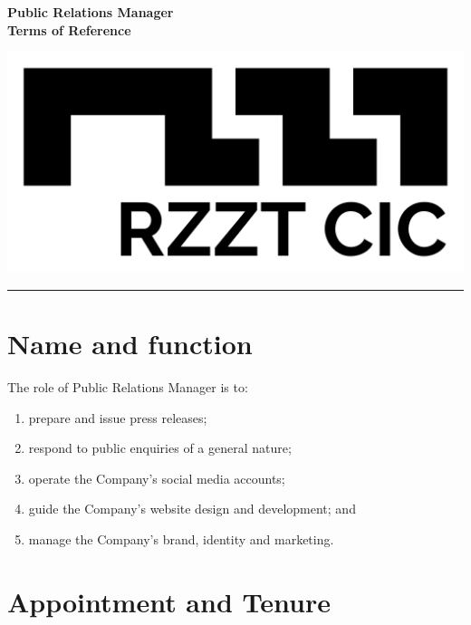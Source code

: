 \documentclass[a4paper,10pt]{article}
\renewcommand{\labelenumi}{(\arabic{enumi})}
\begin{document}
\thispagestyle{firstpage}

\begin{minipage}[b]{0.75\textwidth}
  \raggedright
  \LARGE{\textbf{Public Relations Manager\\Terms of Reference}}
  \vspace{0.2em}
\end{minipage}
%
\begin{minipage}[b]{0.25\textwidth}
  \raggedleft
  \includegraphics[width=1\textwidth]{logo-black.jpg}
\end{minipage}

\hrule

\vspace{2em}

\section{Name and function}

The role of Public Relations Manager is to:

\begin{enumerate}
    \renewcommand{\labelenumi}{(\alph{enumi})}
    \item prepare and issue press releases;
    \item respond to public enquiries of a general nature;
    \item operate the Company’s social media accounts;
    \item guide the Company’s website design and development; and
    \item manage the Company’s brand, identity and marketing.
\end{enumerate}

\section{Appointment and Tenure}
\end{document}
